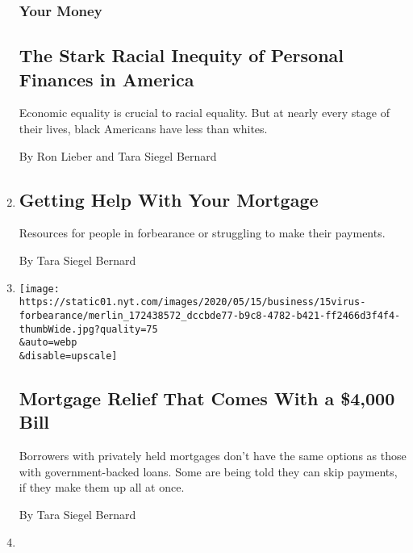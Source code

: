 \begin{enumerate}
  \hypertarget{your-money}{%
  \subsubsection{Your Money}\label{your-money}}

  \hypertarget{the-stark-racial-inequity-of-personal-finances-in-america}{%
  \subsection{The Stark Racial Inequity of Personal Finances in
  America}\label{the-stark-racial-inequity-of-personal-finances-in-america}}

  Economic equality is crucial to racial equality. But at nearly every
  stage of their lives, black Americans have less than whites.

  By Ron Lieber and Tara Siegel Bernard
\item
  \href{/2020/05/15/business/covid-mortgage-forbearance.html}{}

  \hypertarget{getting-help-with-your-mortgage}{%
  \subsection{Getting Help With Your
  Mortgage}\label{getting-help-with-your-mortgage}}

  Resources for people in forbearance or struggling to make their
  payments.

  By Tara Siegel Bernard
\item
  \href{/2020/05/15/business/coronavirus-mortgage-relief.html}{}

  \texttt{[image: https://static01.nyt.com/images/2020/05/15/business/15virus-forbearance/merlin\_172438572\_dccbde77-b9c8-4782-b421-ff2466d3f4f4-thumbWide.jpg?quality=75\\\&auto=webp\\\&disable=upscale]}

  \hypertarget{mortgage-relief-that-comes-with-a-4000-bill}{%
  \subsection{Mortgage Relief That Comes With a \$4,000
  Bill}\label{mortgage-relief-that-comes-with-a-4000-bill}}

  Borrowers with privately held mortgages don't have the same options as
  those with government-backed loans. Some are being told they can skip
  payments, if they make them up all at once.

  By Tara Siegel Bernard
\item
  \href{/2020/05/01/your-money/food-stamps-snap-coronavirus.html}{}


\end{enumerate}
